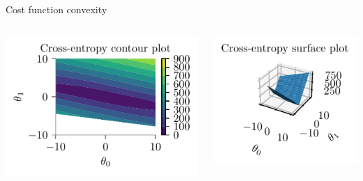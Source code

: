 \documentclass{beamer}
\begin{document}
\begin{frame}{Cost function convexity}
\begin{columns}
	\begin{column}{0.5\textwidth}
		\includegraphics[scale=0.7]{../figures/logistic-regression/logistic-cross-loss-contour.pdf}
	\end{column}
	\begin{column}{0.5\textwidth}
		\includegraphics[scale=0.7]{../figures/logistic-regression/logistic-cross-loss-surface.pdf}
	\end{column}
\end{columns}
\end{frame}
\end{document}
